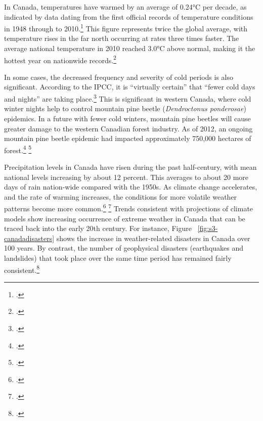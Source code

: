 \documentclass[10pt]{article}
\begin{document}
In Canada, temperatures have warmed by an average of 0.24°C per decade, as indicated by data dating from the first official records of temperature conditions in 1948 through to 2010.\footcite[][p. 13]{TellingWeatherStory}
This figure represents twice the global average, with temperature rises in the far north occurring at rates three times faster. 
The average national temperature in 2010 reached 3.0°C above normal, making it the hottest year on nationwide records.\footcite[][p. 13]{TellingWeatherStory}



In some cases, the decreased frequency and severity of cold periods is also significant.
According to the IPCC, it is ``virtually certain'' that ``fewer cold days and nights'' are taking place.\footcite[][p. 53]{IPCCar4_syr}
This is significant in western Canada, where cold winter nights help to control mountain pine beetle (\emph{Dendroctonus ponderosae}) epidemics.
In a future with fewer cold winters, mountain pine beetles will cause greater damage to the western Canadian forest industry.
As of 2012, an ongoing mountain pine beetle epidemic had impacted approximately 750,000 hectares of forest.\footcite[][]{Chapman2012} \footcite[][]{BeetleEpidemic}



Precipitation levels in Canada have risen during the past half-century, with mean national levels increasing by about 12 percent. 
This averages to about 20 more days of rain nation-wide compared with the 1950s. 
As climate change accelerates, and the rate of warming increases, the conditions for more volatile weather patterns become more common.\footcite[Research published in \emph{Nature Geoscience} notes: ``Precipitation extremes increase in intensity over many regions of the globe in simulations of a warming climate''][]{OGorman2012} \footcite[][]{ExtremeTropical2012}
Trends consistent with projections of climate models show increasing occurrence of extreme weather in Canada that can be traced back into the early 20th century. 
For instance, Figure ~\ref{fig:s3-canadadisasters} shows the increase in weather-related disasters in Canada over 100 years.
By contrast, the number of geophysical disasters (earthquakes and landslides) that took place over the same time period has remained fairly consistent.\footcite[][p. 8]{ScanCCToronto}
\end{document}
